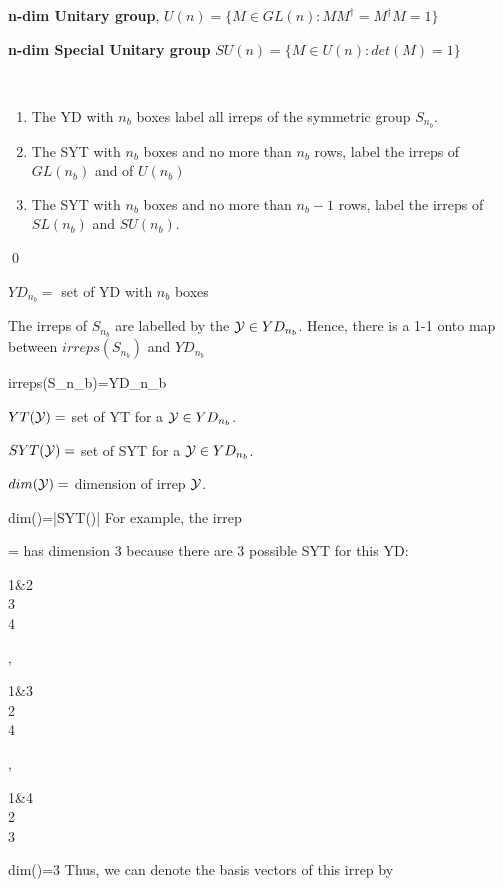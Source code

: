 {\bf n-dim Unitary group}, $U(n)=\{ M\in GL(n):
M M^\dagger =M^\dagger M =1\}$

{\bf n-dim Special Unitary group}
$SU(n)=\{ M\in U(n):
det(M)=1\}$


\begin{claim}\
\begin{enumerate}
\item
The YD with $n_b$ boxes label all irreps of the symmetric group 
$S_{n_b}$.

\item
The SYT with $n_b$ boxes and no more than $n_b$ rows,
label the irreps of $GL(n_b)$ and of $U(n_b)$
\item
The SYT with $n_b$ boxes and
no more than $n_b-1$
rows, label the irreps of $SL(n_b)$ and $SU(n_b)$.
\end{enumerate}
\end{claim}
\proof
\qed



$YD_{n_b}=$ set of YD with $n_b$ boxes

The irreps of $S_{n_b}$  are labelled by the ${\cal Y}\in YD_{n_b}$. 
Hence, there is a 1-1 onto map between $irreps(S_{n_b})$ and $YD_{n_b}$


\beq
irreps(S_{n_b})=YD_{n_b}
\eeq

$YT({\cal Y})=$ set of YT for a ${\cal Y}\in YD_{n_b}$.

$SYT({\cal Y})=$ set of SYT for a ${\cal Y}\in YD_{n_b}$.


$dim({\cal Y})=$ dimension of irrep ${\cal Y}$.

\beq
dim(\caly)=|SYT(\caly)|
\eeq
For example, the 
irrep 

\beq
\caly=
\eeq
has dimension 3 because there are 3 possible SYT for this YD:

\beq
\begin{ytableau}
1&2
\\
3
\\
4
\end{ytableau}
,\quad
\begin{ytableau}
1&3
\\
2
\\
4
\end{ytableau}
,\quad
\begin{ytableau}
1&4
\\
2
\\
3
\end{ytableau}
\implies dim(\caly)=3
\eeq
Thus, we can denote the
basis vectors of this irrep by


